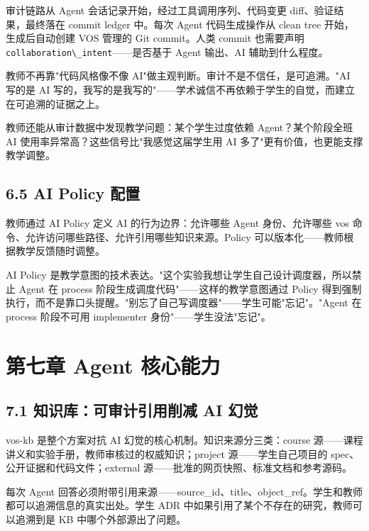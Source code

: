 \documentclass[UTF8,a4paper,12pt,openany]{ctexrep}
\newcommand{\passthrough}[1]{#1}
\begin{document}
审计链路从 Agent 会话记录开始，经过工具调用序列、代码变更 diff、验证结果，最终落在 commit ledger 中。每次 Agent 代码生成操作从 clean tree 开始，生成后自动创建 VOS 管理的 Git commit。人类 commit 也需要声明 \passthrough{\lstinline!collaboration\_intent!}------是否基于 Agent 输出、AI 辅助到什么程度。

教师不再靠"代码风格像不像 AI"做主观判断。审计不是不信任，是可追溯。"AI 写的是 AI 写的，我写的是我写的"------学术诚信不再依赖于学生的自觉，而建立在可追溯的证据之上。

教师还能从审计数据中发现教学问题：某个学生过度依赖 Agent？某个阶段全班 AI 使用率异常高？这些信号比"我感觉这届学生用 AI 多了"更有价值，也更能支撑教学调整。

\section{6.5 AI Policy 配置}\label{65-ai-policy-ux914dux7f6e}

教师通过 AI Policy 定义 AI 的行为边界：允许哪些 Agent 身份、允许哪些 vos 命令、允许访问哪些路径、允许引用哪些知识来源。Policy 可以版本化------教师根据教学反馈随时调整。

AI Policy 是教学意图的技术表达。"这个实验我想让学生自己设计调度器，所以禁止 Agent 在 process 阶段生成调度代码"------这样的教学意图通过 Policy 得到强制执行，而不是靠口头提醒。"别忘了自己写调度器"------学生可能"忘记"。"Agent 在 process 阶段不可用 implementer 身份"------学生没法"忘记"。


\chapter{第七章 Agent 核心能力}\label{ux7b2cux4e03ux7ae0-agent-ux6838ux5fc3ux80fdux529b}

\section{7.1 知识库：可审计引用削减 AI 幻觉}\label{71-ux77e5ux8bc6ux5e93ux53efux5ba1ux8ba1ux5f15ux7528ux524aux51cf-ai-ux5e7bux89c9}

vos-kb 是整个方案对抗 AI 幻觉的核心机制。知识来源分三类：course 源------课程讲义和实验手册，教师审核过的权威知识；project 源------学生自己项目的 spec、公开证据和代码文件；external 源------批准的网页快照、标准文档和参考源码。

每次 Agent 回答必须附带引用来源------source\_id、title、object\_ref。学生和教师都可以追溯信息的真实出处。学生 ADR 中如果引用了某个不存在的研究，教师可以追溯到是 KB 中哪个外部源出了问题。
\end{document}
